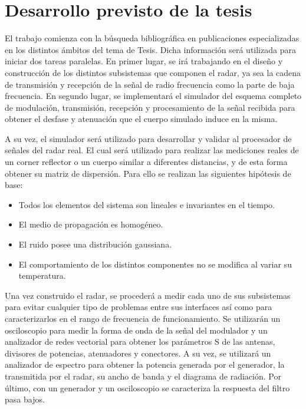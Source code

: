 \chapter{Desarrollo previsto de la tesis} \label{ch:development}


El trabajo comienza con la búsqueda bibliográfica en publicaciones especializadas en los distintos ámbitos del tema de Tesis. Dicha información será utilizada para iniciar dos tareas paralelas. En primer lugar, se irá trabajando en el diseño y construcción de los distintos subsistemas que componen el radar, ya sea la cadena de transmisión y recepción de la señal de radio frecuencia como la parte de baja frecuencia. En segundo lugar, se implementará el simulador del esquema completo de modulación, transmisión, recepción y procesamiento de la señal recibida para obtener el desfase y atenuación que el cuerpo simulado induce en la misma.

A su vez, el simulador será utilizado para desarrollar y validar al procesador de señales del radar real. El cual será utilizado para realizar las mediciones reales de un corner reflector o un cuerpo similar a diferentes distancias, y de esta forma obtener su matriz de dispersión. Para ello se realizan las siguientes hipótesis de base:

\begin{itemize}
    \item Todos los elementos del sistema son lineales e invariantes en el tiempo.
    \item El medio de propagación es homogéneo.
    \item El ruido posee una distribución gaussiana.
    \item El comportamiento de los distintos componentes no se modifica al variar su temperatura.
\end{itemize}

Una vez construido el radar, se procederá a medir cada uno de sus subsistemas para evitar cualquier tipo de problemas entre sus interfaces así como para caracterizarlos en el rango de frecuencia de funcionamiento. Se utilizarán un osciloscopio para medir la forma de onda de la señal del modulador y un analizador de redes vectorial para obtener los parámetros S de las antenas, divisores de potencias, atenuadores y conectores. A su vez, se utilizará un analizador de espectro para obtener la potencia generada por el generador, la transmitida por el radar, su ancho de banda y el diagrama de radiación. Por último, con un generador y un osciloscopio se caracteriza la respuesta del filtro pasa bajos. 

